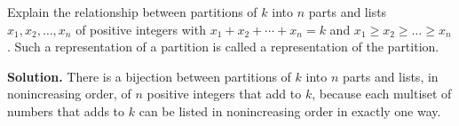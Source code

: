 \documentclass{book}
\begin{document}
\setcounter{project}{210}
\addtocounter{project}{-1}
\begin{activity}[]\label{activity-203}
\hypertarget{p-1194}{}%
Explain the relationship between partitions of \(k\) into \(n\) parts and lists \(x_1,x_2,\ldots,x_n\) of positive integers with \(x_1 + x_2 + \cdots + x_n = k\) and \(x_1\ge x_2\ge\ldots \ge x_n\). Such a representation of a partition is called a  representation of the partition.%
\par\smallskip%
\noindent\textbf{Solution.}\hypertarget{solution-136}{}\quad%
\hypertarget{p-1195}{}%
There is a bijection between partitions of \(k\) into \(n\) parts and lists, in nonincreasing order, of \(n\) positive integers that add to \(k\), because each multiset of numbers that adds to \(k\) can be listed in nonincreasing order in exactly one way.%
\end{activity}
\end{document}
